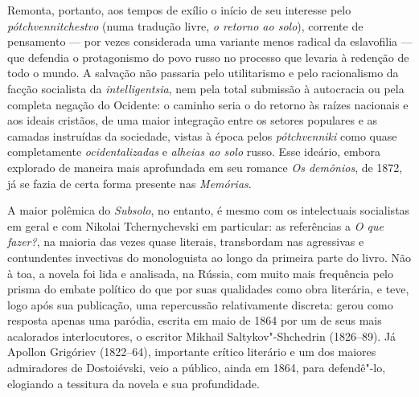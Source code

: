 Remonta, portanto, aos tempos de exílio o início de seu interesse pelo
\textit{pótchvennitchestvo} (numa tradução livre, \textit{o retorno ao solo}),
corrente de pensamento --- por vezes considerada uma variante menos radical da
eslavofilia --- que defendia o protagonismo do povo russo no processo que levaria
à redenção de todo o mundo. A salvação não passaria pelo utilitarismo e pelo
racionalismo da facção socialista da \textit{intelligentsia}, nem pela total
submissão à autocracia ou pela completa negação do Ocidente: o caminho seria o
do retorno às raízes nacionais e aos ideais cristãos, de uma maior integração
entre os setores populares e as camadas instruídas da sociedade, vistas à época
pelos \textit{pótchvenniki} como quase completamente \textit{ocidentalizadas} e
\textit{alheias ao solo} russo. Esse ideário, embora explorado de maneira mais
aprofundada em seu romance \textit{Os demônios}, de 1872, já se fazia de certa
forma presente nas \textit{Memórias}.

A maior polêmica do \textit{Subsolo}, no entanto, é mesmo com os intelectuais
socialistas em geral e com Nikolai Tchernychevski em particular: as referências
a \textit{O que fazer?}, na maioria das vezes quase literais, transbordam nas
agressivas e contundentes invectivas do monologuista ao longo da primeira parte
do livro. Não à toa, a novela foi lida e analisada, na Rússia, com muito mais
frequência pelo prisma do embate político do que por suas qualidades como obra
literária, e teve, logo após sua publicação, uma repercussão relativamente
discreta: gerou como resposta apenas uma paródia, escrita em maio de 1864 por
um de seus mais acalorados interlocutores, o escritor Mikhail Saltykov"-Shchedrin
(1826--89). Já Apollon Grigóriev (1822--64), importante crítico literário e um
dos maiores admiradores de Dostoiévski, veio a público, ainda em 1864, para
defendê"-lo, elogiando a tessitura da novela e sua profundidade.

